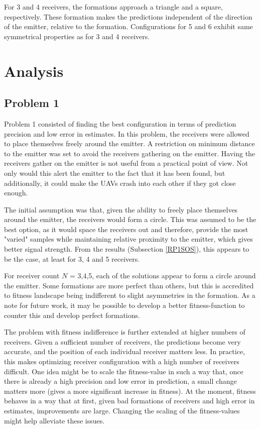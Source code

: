 \documentclass[10pt,a4paper]{book}
\begin{document}
For 3 and 4 receivers, the formations approach a triangle and a square, respectively. These formation makes the predictions independent of the direction of the emitter, relative to the formation. Configurations for 5 and 6 exhibit same symmetrical properties as for 3 and 4 receivers. 




\newpage

\section{Analysis}

\subsection{Problem 1}
\label{RP1GS}

Problem 1 consisted of finding the best configuration in terms of prediction precision and low error in estimates. In this problem, the receivers were allowed to place themselves freely around the emitter. A restriction on minimum distance to the emitter was set to avoid the receivers gathering on the emitter. Having the receivers gather on the emitter is not useful from a practical point of view. Not only would this alert the emitter to the fact that it has been found, but additionally, it could make the \glspl{UAV} crash into each other if they got close enough.

The initial assumption was that, given the ability to freely place themselves around the emitter, the receivers would form a circle. This was assumed to be the best option, as it would space the receivers out and therefore, provide the most "varied" samples while maintaining relative proximity to the emitter, which gives better signal strength. From the results (Subsection \ref{RP1SOS}), this appears to be the case, at least for 3, 4 and 5 receivers.

For receiver count $N$ = 3,4,5, each of the solutions appear to form a circle around the emitter. Some formations are more perfect than others, but this is accredited to fitness landscape being indifferent to slight asymmetries in the formation. As a note for future work, it may be possible to develop a better fitness-function to counter this and develop perfect formations. 

The problem with fitness indifference is further extended at higher numbers of receivers. Given a sufficient number of receivers, the predictions become very accurate, and the position of each individual receiver matters less. In practice, this makes optimizing receiver configuration with a high number of receivers difficult. One idea might be to scale the fitness-value in such a way that, once there is already a high precision and low error in prediction, a small change matters more (gives a more significant increase in fitness). At the moment, fitness behaves in a way that at first, given bad formations of receivers and high error in estimates, improvements are large. Changing the scaling of the fitness-values might help alleviate these issues.
\end{document}
